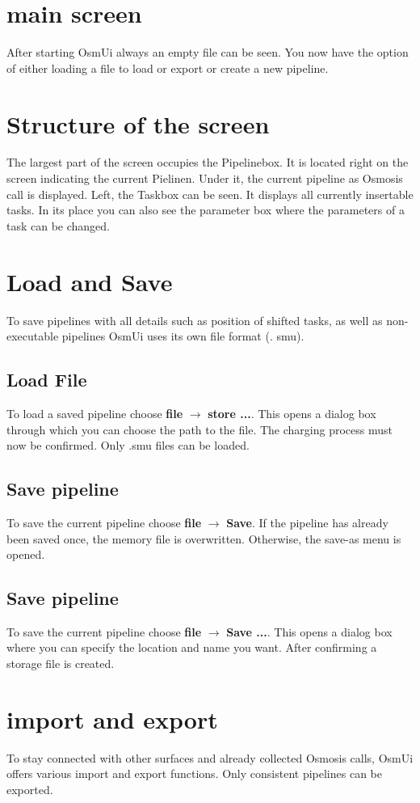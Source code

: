 \documentclass[a4paper,10pt]{scrartcl}
\begin{document}
\section {main screen}
After starting OsmUi always an empty file can be seen. You now have the option of either loading a file to load or export or create a new pipeline.

\section {Structure of the screen}
The largest part of the screen occupies the Pipelinebox. It is located right on the screen indicating the current Pielinen. Under it, the current pipeline as Osmosis call is displayed. Left, the Taskbox can be seen. It displays all currently insertable tasks. In its place you can also see the parameter box where the parameters of a task can be changed.

\section {Load and Save}
To save pipelines with all details such as position of shifted tasks, as well as non-executable pipelines OsmUi uses its own file format (. smu).
\subsection {Load File}
To load a saved pipeline choose \textbf {file} $ \rightarrow $ \textbf {store ...}. This opens a dialog box through which you can choose the path to the file. The charging process must now be confirmed. Only .smu files can be loaded.
\subsection {Save pipeline}
To save the current pipeline choose \textbf {file} $ \rightarrow $ \textbf {Save}. If the pipeline has already been saved once, the memory file is overwritten. Otherwise, the save-as menu is opened.
\subsection {Save pipeline}
To save the current pipeline choose \textbf {file} $ \rightarrow $ \textbf {Save ...}. This opens a dialog box where you can specify the location and name you want. After confirming a storage file is created.

\section {import and export}
To stay connected with other surfaces and already collected Osmosis calls, OsmUi offers various import and export functions. Only consistent pipelines can be exported.
\end{document}
